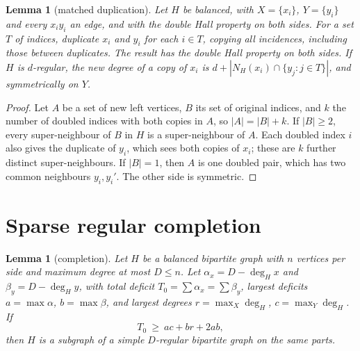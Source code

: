 \documentclass[11pt]{amsart}
\newtheorem{lemma}[theorem]{Lemma}
\theoremstyle{definition}
\theoremstyle{remark}
\begin{document}
\begin{lemma}[matched duplication]\label{lem:dup}
Let $H$ be balanced, with $X=\{x_i\}$, $Y=\{y_i\}$ and every $x_iy_i$ an edge, and with the
double Hall property on both sides. For a set $T$ of indices, duplicate $x_i$ and $y_i$ for
each $i\in T$, copying all incidences, including those between duplicates. The result has
the double Hall property on both sides. If $H$ is $d$-regular, the new degree of a copy of
$x_i$ is $d+|N_H(x_i)\cap\{y_j:j\in T\}|$, and symmetrically on $Y$.
\end{lemma}

\begin{proof}
Let $A$ be a set of new left vertices, $B$ its set of original indices, and $k$ the number
of doubled indices with both copies in $A$, so $|A|=|B|+k$. If $|B|\ge2$, every
super-neighbour of $B$ in $H$ is a super-neighbour of $A$. Each doubled index $i$ also gives
the duplicate of $y_i$, which sees both copies of $x_i$; these are $k$ further distinct
super-neighbours. If $|B|=1$, then $A$ is one doubled pair, which has two common neighbours
$y_i,y_i'$. The other side is symmetric.
\end{proof}

\section{Sparse regular completion}\label{sec:completion}

\begin{lemma}[completion]\label{lem:completion}
Let $H$ be a balanced bipartite graph with $n$ vertices per side and maximum degree at most
$D\le n$. Let $\alpha_x=D-\deg_H x$ and $\beta_y=D-\deg_H y$, with total deficit
$T_0=\sum\alpha_x=\sum\beta_y$, largest deficits $a=\max\alpha$, $b=\max\beta$, and largest
degrees $r=\max_X\deg_H$, $c=\max_Y\deg_H$. If
\[
  T_0\ \ge\ ac+br+2ab,
\]
then $H$ is a subgraph of a simple $D$-regular bipartite graph on the same parts.
\end{lemma}
\end{document}
